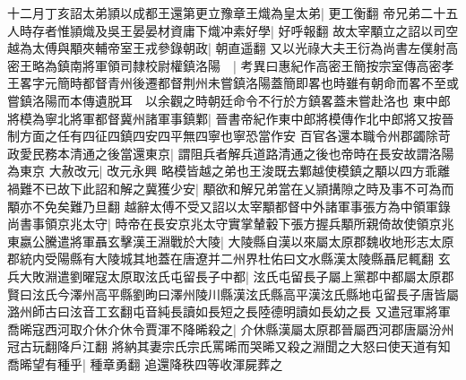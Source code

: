 十二月丁亥詔太弟頴以成都王還第更立豫章王熾為皇太弟|{
	更工衡翻}
帝兄弟二十五人時存者惟頴熾及吳王晏晏材資庸下熾冲素好學|{
	好呼報翻}
故太宰顒立之詔以司空越為太傅與顒夾輔帝室王戎參錄朝政|{
	朝直遥翻}
又以光祿大夫王衍為尚書左僕射高密王略為鎮南將軍領司隸校尉權鎮洛陽　|{
	考異曰惠紀作高密王簡按宗室傳高密孝王畧字元簡時都督青州後遷都督荆州未嘗鎮洛陽蓋簡即畧也時雖有朝命而畧不至或嘗鎮洛陽而本傳遺脱耳　以余觀之時朝廷命令不行於方鎮畧蓋未嘗赴洛也}
東中郎將模為寧北將軍都督冀州諸軍事鎮鄴|{
	晉書帝紀作東中郎將模傳作北中郎將又按晉制方面之任有四征四鎮四安四平無四寧也寧恐當作安}
百官各還本職令州郡蠲除苛政愛民務本清通之後當還東京|{
	謂阻兵者解兵道路清通之後也帝時在長安故謂洛陽為東京}
大赦改元|{
	改元永興}
略模皆越之弟也王浚既去鄴越使模鎮之顒以四方乖離禍難不已故下此詔和解之冀獲少安|{
	顒欲和解兄弟當在乂頴搆隙之時及事不可為而顒亦不免矣難乃旦翻}
越辭太傅不受又詔以太宰顒都督中外諸軍事張方為中領軍錄尚書事領京兆太守|{
	時帝在長安京兆太守實掌輦轂下張方握兵顒所親倚故使領京兆}
東嬴公騰遣將軍聶玄擊漢王淵戰於大陵|{
	大陵縣自漢以來屬太原郡魏收地形志太原郡統内受陽縣有大陵城其地蓋在唐遼并二州界杜佑曰文水縣漢太陵縣聶尼輒翻}
玄兵大敗淵遣劉曜寇太原取泫氏屯留長子中都|{
	泫氏屯留長子屬上黨郡中都屬太原郡賢曰泫氏今澤州高平縣劉昫曰澤州陵川縣漢泫氏縣高平漢泫氏縣地屯留長子唐皆屬潞州師古曰泫音工玄翻屯音純長讀如長短之長陸德明讀如長幼之長}
又遣冠軍將軍喬晞寇西河取介休介休令賈渾不降晞殺之|{
	介休縣漢屬太原郡晉屬西河郡唐屬汾州冠古玩翻降戶江翻}
將納其妻宗氏宗氏罵晞而哭晞又殺之淵聞之大怒曰使天道有知喬晞望有種乎|{
	種章勇翻}
追還降秩四等收渾屍葬之

